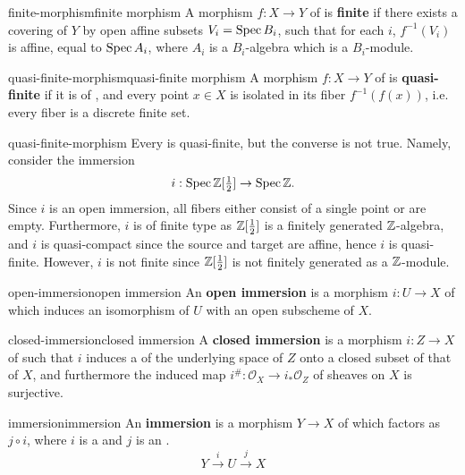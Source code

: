 \begin{topic}{finite-morphism}{finite morphism}
    A morphism $f : X \to Y$ of  is \textbf{finite} if there exists a covering of $Y$ by open affine subsets $V_i = \operatorname{Spec} B_i$, such that for each $i$, $f^{-1}(V_i)$ is affine, equal to $\operatorname{Spec} A_i$, where $A_i$ is a $B_i$-algebra which is a  $B_i$-module.
\end{topic}

\begin{topic}{quasi-finite-morphism}{quasi-finite morphism}
    A morphism $f : X \to Y$ of  is \textbf{quasi-finite} if it is of , and every point $x \in X$ is isolated in its fiber $f^{-1}(f(x))$, i.e. every fiber is a discrete finite set.
\end{topic}

\begin{example}{quasi-finite-morphism}
    Every  is quasi-finite, but the converse is not true. Namely, consider the immersion
    \[ i : \operatorname{Spec} \mathbb{Z}[\tfrac{1}{2}] \to \operatorname{Spec} \mathbb{Z} . \]
    Since $i$ is an open immersion, all fibers either consist of a single point or are empty. Furthermore, $i$ is of finite type as $\mathbb{Z}[\tfrac{1}{2}]$ is a finitely generated $\mathbb{Z}$-algebra, and $i$ is quasi-compact since the source and target are affine, hence $i$ is quasi-finite. However, $i$ is not finite since $\mathbb{Z}[\tfrac{1}{2}]$ is not finitely generated as a $\mathbb{Z}$-module.
\end{example}

\begin{topic}{open-immersion}{open immersion}
    An \textbf{open immersion} is a morphism $i : U \to X$ of  which induces an isomorphism of $U$ with an open subscheme of $X$.
\end{topic}

\begin{topic}{closed-immersion}{closed immersion}
    A \textbf{closed immersion} is a morphism $i : Z \to X$ of  such that $i$ induces a  of the underlying space of $Z$ onto a closed subset of that of $X$, and furthermore the induced map $i^\# : \mathcal{O}_X \to i_*\mathcal{O}_Z$ of sheaves on $X$ is surjective.
\end{topic}

\begin{topic}{immersion}{immersion}
    An \textbf{immersion} is a morphism $Y \to X$ of  which factors as $j \circ i$, where $i$ is a  and $j$ is an .
    \[ Y \xrightarrow{i} U \xrightarrow{j} X \]
\end{topic}

